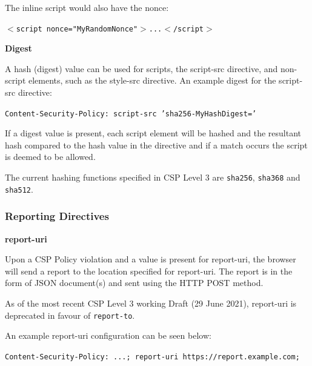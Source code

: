 \documentclass{mscreport}
\begin{document}
\vspace{0.3cm} \noindent
The inline script would also have the nonce:

\vspace{0.3cm} \noindent
\texttt{$<$script nonce="MyRandomNonce"$>$...$<$/script$>$}



\vspace{0.7cm} \noindent
\textbf{Digest}

\vspace{0.3cm} \noindent
A hash (digest) value can be used for scripts, the script-src directive, and non-script elements, such as the style-src directive. An example digest for the script-src directive:

\vspace{0.3cm} \noindent
\texttt{Content-Security-Policy: script-src 'sha256-MyHashDigest='}

\vspace{0.3cm} \noindent
If a digest value is present, each script element will be hashed and the resultant hash compared to the hash value in the directive and if a match occurs the script is deemed to be allowed.

\vspace{0.3cm} \noindent
The current hashing functions specified in CSP Level 3 are \texttt{sha256}, \texttt{sha368} and \texttt{sha512}.

\subsubsection{Reporting Directives}

\textbf{report-uri}

\vspace{0.3cm} \noindent
Upon a CSP Policy violation and a value is present for report-uri, the browser will send a report to the location specified for report-uri. The report is in the form of JSON document(s) and sent using the HTTP POST method.

\vspace{0.3cm} \noindent
As of the most recent CSP Level 3 working Draft (29 June 2021), report-uri is deprecated in favour of \texttt{report-to}.

\vspace{0.3cm} \noindent
An example report-uri configuration can be seen below:

\vspace{0.3cm} \noindent
\texttt{Content-Security-Policy: ...; report-uri https://report.example.com;}
\end{document}
